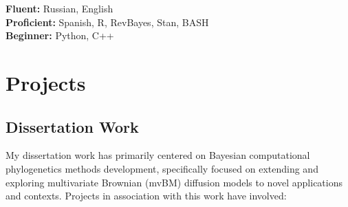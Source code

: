 \documentclass[12pt]{article}
\begin{document}
\textbf{Fluent:} Russian, English\\
\textbf{Proficient:} Spanish, R, RevBayes, Stan, BASH\\
\textbf{Beginner:} Python, C++\\

\section{Projects}

\subsection{Dissertation Work}

My dissertation work has primarily centered on Bayesian computational phylogenetics methods development, specifically focused on extending and exploring multivariate Brownian (mvBM) diffusion models to novel applications and contexts. Projects in association with this work have involved:
\end{document}
